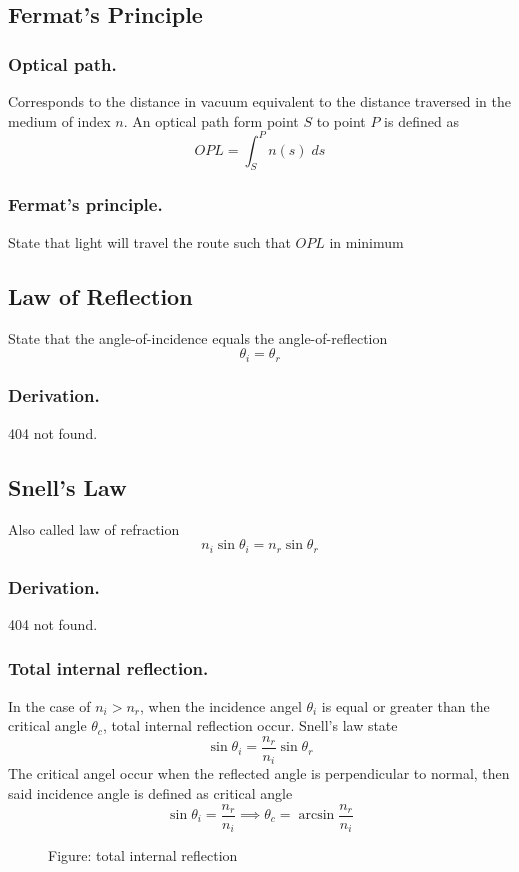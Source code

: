 \documentclass[../../../main.tex]{subfiles}
\begin{document}
\subsection{Fermat's Principle}
\subsubsection{Optical path.} Corresponds to the distance in vacuum equivalent to the distance traversed in the medium of index $n$. An  optical path form point $S$ to point $P$ is defined as 
\begin{equation*}
    OPL=\int_{S}^{P}n(s)\;ds
\end{equation*}

\subsubsection{Fermat's principle.} State that light will travel the route such that $OPL$ in minimum 

\subsection{Law of Reflection}
State that the angle-of-incidence equals the angle-of-reflection
\begin{equation*}
    \theta_i=\theta_r
\end{equation*}
\subsubsection{Derivation.} 404 not found.

\subsection{Snell’s Law}
Also called law of refraction
\begin{equation*}
    n_i\sin\theta_i = n_r\sin\theta_r
\end{equation*}

\subsubsection{Derivation.} 404 not found.

\subsubsection{Total internal reflection.} In the case of $n_i>n_r$, when the incidence angel $\theta_i$ is equal or greater than the critical angle $\theta_c$, total internal reflection occur. Snell's law state 
\begin{equation*}
    \sin\theta_i =\frac{n_r}{n_i}\sin\theta_r
\end{equation*}
The critical angel occur when the reflected angle is perpendicular to normal, then said incidence angle is defined as critical angle
\begin{equation*}
    \sin\theta_i =\frac{n_r}{n_i}\implies \theta_c=\arcsin \frac{n_r}{n_i}
\end{equation*}

\begin{figure}[b]
    \centering
    \caption*{Figure: total internal reflection}
\end{figure}
\end{document}
